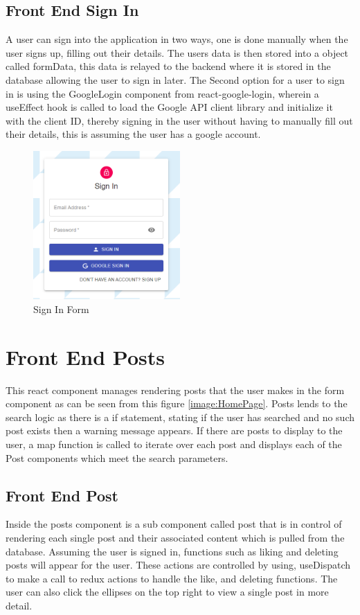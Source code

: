 \subsection{Front End Sign In}
A user can sign into the application in two ways, one is done manually when the user signs up, filling out their details. The users data is then stored into a object called formData, this data is relayed to the backend where it is stored in the database allowing the user to sign in later. The Second option for a user to sign in is using the GoogleLogin component from react-google-login, wherein a useEffect hook is called to load the Google API client library and initialize it with the client ID, thereby signing in the user without having to manually fill out their details, this is assuming the user has a google account.

\begin{figure}[h!]
    \centering
    \includegraphics[width=0.5\textwidth]{images/SignIn.png}
    \caption{Sign In Form}
    \label{image:SignUp}
\end{figure}

\section{Front End Posts}
This react component manages rendering posts that the user makes in the form component as can be seen from this figure \ref{image:HomePage}. Posts lends to the search logic as there is a if statement, stating if the user has searched and no such post exists then a warning message appears. If there are posts to display to the user, a map function is called to iterate over each post and displays each of the Post components which meet the search parameters.

\subsection{Front End Post}
Inside the posts component is a sub component called post that is in control of rendering each single post and their associated content which is pulled from the database. Assuming the user is signed in, functions such as liking and deleting posts will appear for the user. These actions are controlled by using, useDispatch to make a call to redux actions to handle the like, and deleting functions. The user can also click the ellipses on the top right to view a single post in more detail.

